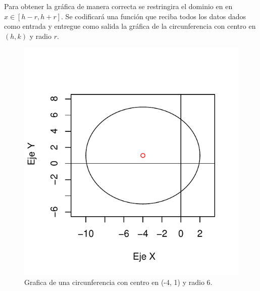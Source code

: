 \documentclass[12pt,a4paper]{report}
\begin{document}
Para obtener la gráfica de manera correcta se restringira el dominio en en $x \in [h - r, h + r]$. Se codificará una función que reciba todos los datos dados como entrada y entregue como salida la gráfica de la circunferencia con centro en $(h, k)$ y radio $r$.

\begin{figure}
\centering
\includegraphics[scale=0.9]{Circunferencia1}
\caption{Grafica de una circunferencia con centro en (-4, 1) y radio 6.}
\label{fig:Circunferencia1}
\end{figure}
\end{document}
